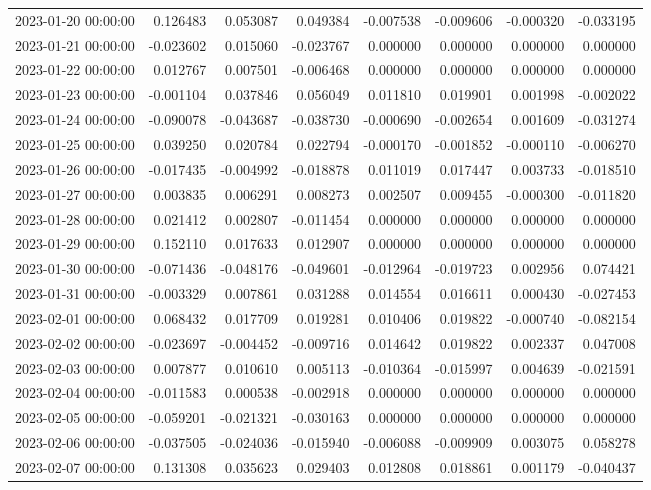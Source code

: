 \begin{tabular}{lrrrrrrr}
2023-01-20 00:00:00 & 0.126483 & 0.053087 & 0.049384 & -0.007538 & -0.009606 & -0.000320 & -0.033195 \\
2023-01-21 00:00:00 & -0.023602 & 0.015060 & -0.023767 & 0.000000 & 0.000000 & 0.000000 & 0.000000 \\
2023-01-22 00:00:00 & 0.012767 & 0.007501 & -0.006468 & 0.000000 & 0.000000 & 0.000000 & 0.000000 \\
2023-01-23 00:00:00 & -0.001104 & 0.037846 & 0.056049 & 0.011810 & 0.019901 & 0.001998 & -0.002022 \\
2023-01-24 00:00:00 & -0.090078 & -0.043687 & -0.038730 & -0.000690 & -0.002654 & 0.001609 & -0.031274 \\
2023-01-25 00:00:00 & 0.039250 & 0.020784 & 0.022794 & -0.000170 & -0.001852 & -0.000110 & -0.006270 \\
2023-01-26 00:00:00 & -0.017435 & -0.004992 & -0.018878 & 0.011019 & 0.017447 & 0.003733 & -0.018510 \\
2023-01-27 00:00:00 & 0.003835 & 0.006291 & 0.008273 & 0.002507 & 0.009455 & -0.000300 & -0.011820 \\
2023-01-28 00:00:00 & 0.021412 & 0.002807 & -0.011454 & 0.000000 & 0.000000 & 0.000000 & 0.000000 \\
2023-01-29 00:00:00 & 0.152110 & 0.017633 & 0.012907 & 0.000000 & 0.000000 & 0.000000 & 0.000000 \\
2023-01-30 00:00:00 & -0.071436 & -0.048176 & -0.049601 & -0.012964 & -0.019723 & 0.002956 & 0.074421 \\
2023-01-31 00:00:00 & -0.003329 & 0.007861 & 0.031288 & 0.014554 & 0.016611 & 0.000430 & -0.027453 \\
2023-02-01 00:00:00 & 0.068432 & 0.017709 & 0.019281 & 0.010406 & 0.019822 & -0.000740 & -0.082154 \\
2023-02-02 00:00:00 & -0.023697 & -0.004452 & -0.009716 & 0.014642 & 0.019822 & 0.002337 & 0.047008 \\
2023-02-03 00:00:00 & 0.007877 & 0.010610 & 0.005113 & -0.010364 & -0.015997 & 0.004639 & -0.021591 \\
2023-02-04 00:00:00 & -0.011583 & 0.000538 & -0.002918 & 0.000000 & 0.000000 & 0.000000 & 0.000000 \\
2023-02-05 00:00:00 & -0.059201 & -0.021321 & -0.030163 & 0.000000 & 0.000000 & 0.000000 & 0.000000 \\
2023-02-06 00:00:00 & -0.037505 & -0.024036 & -0.015940 & -0.006088 & -0.009909 & 0.003075 & 0.058278 \\
2023-02-07 00:00:00 & 0.131308 & 0.035623 & 0.029403 & 0.012808 & 0.018861 & 0.001179 & -0.040437 \\

\end{tabular}

